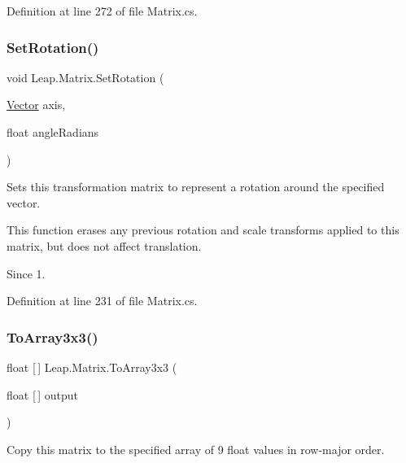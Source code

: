 Definition at line 272 of file Matrix.\+cs.

\mbox{\label{struct_leap_1_1_matrix_a16f32d54d64ff6ed670844ede0dd7720}} 
\subsubsection{\texorpdfstring{SetRotation()}{SetRotation()}}
{\footnotesize\ttfamily void Leap.\+Matrix.\+Set\+Rotation (\begin{DoxyParamCaption}\item[{\mbox{\hyperlink{struct_leap_1_1_vector}{Vector}}}]{axis,  }\item[{float}]{angle\+Radians }\end{DoxyParamCaption})}



Sets this transformation matrix to represent a rotation around the specified vector. 

This function erases any previous rotation and scale transforms applied to this matrix, but does not affect translation.

\begin{DoxySince}{Since}
1. 
\end{DoxySince}


Definition at line 231 of file Matrix.\+cs.

\mbox{\label{struct_leap_1_1_matrix_a474eb2aa4ad08d234f7fc0242108ec0b}} 
\subsubsection{\texorpdfstring{ToArray3x3()}{ToArray3x3()}\hspace{0.1cm}{\footnotesize\ttfamily [1/3]}}
{\footnotesize\ttfamily float \mbox{[}$\,$\mbox{]} Leap.\+Matrix.\+To\+Array3x3 (\begin{DoxyParamCaption}\item[{float \mbox{[}$\,$\mbox{]}}]{output }\end{DoxyParamCaption})}



Copy this matrix to the specified array of 9 float values in row-\/major order. 




